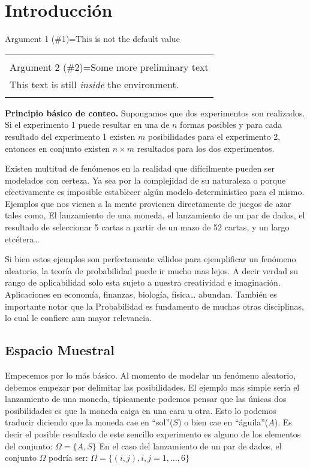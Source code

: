 \documentclass[14pt]{extreport}
\newcounter{ejemplo}[chapter]
\newenvironment{mybox}[2][This is a box]
    {\begin{center}
    Argument 1 (\#1)=#1\\[1ex]
    \begin{tabular}{|p{\textwidth}|}
    \hline\\
    Argument 2 (\#2)=#2\\[2ex]
    }
    { 
    \\\\\hline
    \end{tabular} 
    \end{center}
    }
\begin{document}
\chapter{Introducción}


\begin{mybox}[This is not the default value]{Some more preliminary text}
This text is still \textit{inside} the environment.
\end{mybox}

\begin{tcolorbox}
 \textbf{Principio básico de conteo.}
\tcblower
Supongamos que dos experimentos son realizados. Si el experimento 1 puede resultar en una de $n$ formas posibles y para cada resultado del experimento 1 existen $m$ posibilidades para el experimento 2, entonces en conjunto existen $n\times m$ resultados para los dos experimentos.
\end{tcolorbox}



Existen multitud de fenómenos en la realidad que difícilmente pueden ser modelados con certeza. Ya sea por la complejidad de su naturaleza o
porque efectivamente es imposible establecer algún modelo determinístico para el mismo. Ejemplos que nos vienen a la mente provienen directamente
de juegos de azar tales como, El lanzamiento de una moneda, el lanzamiento de un par de dados, el resultado de seleccionar 5 cartas a partir de un mazo de 52 cartas, y un largo etcétera\ldots{}

Si bien estos ejemplos son perfectamente válidos para ejemplificar un fenómeno aleatorio, la teoría de probabilidad puede ir mucho mas lejos. A decir verdad su rango de aplicabilidad solo esta sujeto a nuestra creatividad e imaginación. Aplicaciones en economía, finanzas, biología, física\dots{} abundan. También es importante notar que la Probabilidad es fundamento de muchas otras disciplinas, lo cual le confiere aun mayor relevancia.


\section{Espacio Muestral}

Empecemos por lo más básico. Al momento de modelar un fenómeno aleatorio, debemos empezar por delimitar las posibilidades. El ejemplo mas simple sería el lanzamiento de una moneda, típicamente podemos pensar que las únicas dos posibilidades es que la moneda caiga en una cara u otra. Esto lo podemos traducir diciendo que la moneda cae en ``sol''($S$) o bien cae en ``águila''($A$). Es decir el posible resultado de este sencillo experimento es alguno de los elementos del conjunto: $\Omega = \{A, S\}$ En el caso del lanzamiento de un par de dados, el conjunto $\Omega$ podría ser: $\Omega = \{(i , j), i , j = 1,\ldots , 6\}$
\end{document}
